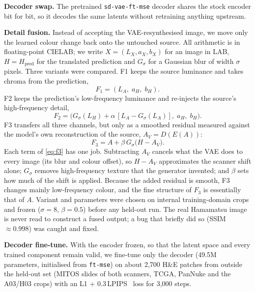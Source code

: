 \textbf{Decoder swap.} The pretrained \texttt{sd-vae-ft-mse} decoder shares the stock encoder bit for bit,
so it decodes the same latents without retraining anything upstream.

\textbf{Detail fusion.} Instead of accepting the VAE-resynthesised image, we move only the learned
colour change back onto the untouched source. All arithmetic is in floating-point CIELAB; we write
$X=(L_X,a_X,b_X)$ for an image in LAB, $H=H_{\mathrm{pred}}$ for the translated prediction and $G_\sigma$ for
a Gaussian blur of width $\sigma$ pixels. Three variants were compared. F1 keeps the source luminance and
takes chroma from the prediction,
\begin{equation}
F_1=(L_A,\;a_H,\;b_H).
\label{eq:f1}
\end{equation}
F2 keeps the prediction's low-frequency luminance and re-injects the source's high-frequency detail,
\begin{equation}
F_2=\bigl(G_\sigma(L_H)+\alpha\,[L_A-G_\sigma(L_A)],\;a_H,\;b_H\bigr).
\label{eq:f2}
\end{equation}
F3 transfers all three channels, but only as a smoothed residual measured against the model's own
reconstruction of the source, $A_V=D(E(A))$:
\begin{equation}
F_3=A+\beta\,G_\sigma\!\bigl(H-A_V\bigr).
\label{eq:f3}
\end{equation}
Each term of \eqref{eq:f3} has one job. Subtracting $A_V$ cancels what the VAE does to every image
(its blur and colour offset), so $H-A_V$ approximates the scanner shift alone; $G_\sigma$ removes
high-frequency texture that the generator invented; and $\beta$ sets how much of the shift is applied.
Because the added residual is smooth, F3 changes mainly low-frequency colour, and the fine structure of
$F_3$ is essentially that of $A$. Variant and parameters were chosen on internal training-domain crops
and frozen ($\sigma=8$, $\beta=0.5$) before any held-out run. The real Hamamatsu image is never read to
construct a fused output; a bug that briefly did so (SSIM $\approx0.998$) was caught and fixed.

\textbf{Decoder fine-tune.} With the encoder frozen, so that the latent space and every trained component
remain valid, we fine-tune only the decoder (49.5M parameters, initialised from \texttt{ft-mse}) on about
2{,}700 H\&E patches from outside the held-out set (MITOS slides of both scanners, TCGA, PanNuke and the A03/H03 crops)
with an L1 + 0.3\,LPIPS~\cite{zhang2018lpips} loss for 3{,}000 steps.

